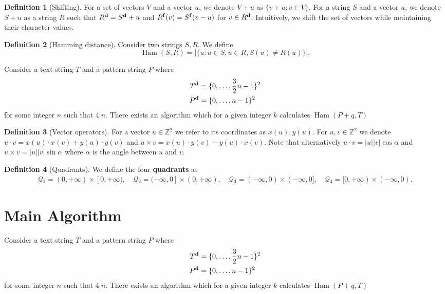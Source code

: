 \documentclass[11pt]{article}
\newcommand{\Z}{\mathbb{Z}}
\newcommand{\set}[1]{\lbrace #1 \rbrace}
\newcommand{\eq}[1]{\begin{align*} #1 \end{align*}}
\DeclareMathOperator*{\Ham}{Ham}
\theoremstyle{plain}
\theoremstyle{definition}
\newtheorem{definition}{Definition}
\begin{document}
\begin{definition}[Shifting]
	For a set of vectors $V$ and a vector $u$, we denote $V + u$ as $\set{v + u : v \in V}$.
	For a string $S$ and a vector $u$, we denote $S + u$ as a string $R$ such that
	$R^\mathbf{d} = S^\mathbf{d} + u$ and $R^\mathbf{f}(v) = S^\mathbf{f}(v - u)$ for $v \in R^\mathbf{d}$.
	Intuitively, we shift the set of vectors while maintaining their character values.
\end{definition}


\begin{definition}[Hamming distance]
	Consider two strings $S, R$. We define
	$$ \Ham(S, R) = |\set{u : u \in S, u \in R, S(u) \neq R(u)}|.$$
\end{definition}

Consider a text string $T$ and a pattern string $P$ where
\eq{
	\d{T} &= \set{0, \dots, \frac{3}{2}n - 1}^2 \\
	\d{P} &= \set{0, \dots, n - 1}^2
}
for some integer $n$ such that $4|n$.
There exists an algorithm which for a given integer $k$ calculates
$ \Ham(P + q, T) $



\begin{definition}[Vector operators]
	For a vector $u \in \Z^2$ we refer to its coordinates as $x(u), y(u)$.
	For $u, v \in \Z^2$ we denote $u \cdot v = x(u) \cdot x(v) + y(u) \cdot y(v)$
	and $u \times v = x(u) \cdot y(v) - y(u) \cdot x(v)$.
	Note that alternatively $u \cdot v = |u||v| \cos \alpha$ and $u \times v = |u||v| \sin \alpha$ where $\alpha$ is the angle between $u$ and $v$.
\end{definition}


\newcommand{\Q}{\mathcal{Q}}
\begin{definition}[Quadrants]
	We define the four \textbf{quadrants} as
	\eq{
		\Q_1 = (0, +\infty) \times [0, +\infty), \quad
		\Q_2 = (-\infty, 0] \times (0, +\infty), \quad
		\Q_3 = (-\infty, 0) \times (-\infty, 0], \quad
		\Q_4 = [0, +\infty) \times (-\infty, 0).
	}
\end{definition}




\section{Main Algorithm}

Consider a text string $T$ and a pattern string $P$ where
\eq{
	\d{T} &= \set{0, \dots, \frac{3}{2}n - 1}^2 \\
	\d{P} &= \set{0, \dots, n - 1}^2
}
for some integer $n$ such that $4|n$.
There exists an algorithm which for a given integer $k$ calculates
$ \Ham(P + q, T) $
\end{document}
